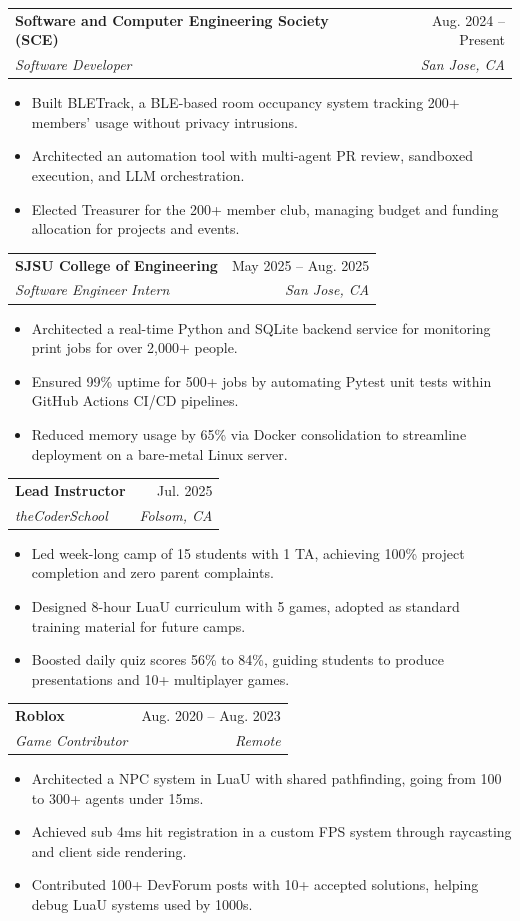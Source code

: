 \documentclass[letterpaper,11pt]{article}
\makeatletter
\newcommand{\resumeItem}[1]{
  \item\small{
    {#1 \vspace{-2pt}}
  }
}
\newcommand{\resumeSubheading}[4]{
  \vspace{-2pt}\item
    \begin{tabular*}{0.97\textwidth}[t]{l@{\extracolsep{\fill}}r}
      \textbf{#1} & #2 \\
      \textit{\small#3} & \textit{\small #4} \\
    \end{tabular*}\vspace{-7pt}
}
\newcommand{\resumeItemListStart}{\begin{itemize}}
\newcommand{\resumeItemListEnd}{\end{itemize}\vspace{-5pt}}
\makeatother
\begin{document}
\resumeSubheading
{Software and Computer Engineering Society (SCE)}{Aug. 2024 -- Present}
{Software Developer}{San Jose, CA}
\resumeItemListStart
\resumeItem{Built BLETrack, a BLE-based room occupancy system tracking 200+ members' usage without privacy intrusions.}
\resumeItem{Architected an automation tool with multi-agent PR review, sandboxed execution, and LLM orchestration.}
\resumeItem{Elected Treasurer for the 200+ member club, managing budget and funding allocation for projects and events.}
\resumeItemListEnd



\resumeSubheading
{SJSU College of Engineering}{May 2025 -- Aug. 2025}
{Software Engineer Intern}{San Jose, CA}
\resumeItemListStart
\resumeItem{Architected a real-time Python and SQLite backend service for monitoring print jobs for over 2,000+ people.}
\resumeItem{Ensured 99\% uptime for 500+ jobs by automating Pytest unit tests within GitHub Actions CI/CD pipelines.}
\resumeItem{Reduced memory usage by 65\% via Docker consolidation to streamline deployment on a bare-metal Linux server.}
\resumeItemListEnd

\resumeSubheading
{Lead Instructor}{Jul. 2025}
{theCoderSchool}{Folsom, CA}
\resumeItemListStart
\resumeItem{Led week-long camp of 15 students with 1 TA, achieving 100\% project completion and zero parent complaints.}
\resumeItem{Designed 8-hour LuaU curriculum with 5 games, adopted as standard training material for future camps.}
\resumeItem{Boosted daily quiz scores 56\% to 84\%, guiding students to produce presentations and 10+ multiplayer games.}
\resumeItemListEnd

\resumeSubheading
{Roblox}{Aug. 2020 -- Aug. 2023}
{Game Contributor}{Remote}
\resumeItemListStart
\resumeItem{Architected a NPC system in LuaU with shared pathfinding, going from 100 to 300+ agents under 15ms.}
\resumeItem{Achieved sub 4ms hit registration in a custom FPS system through raycasting and client side rendering.}
\resumeItem{Contributed 100+ DevForum posts with 10+ accepted solutions, helping debug LuaU systems used by 1000s.}
\resumeItemListEnd
\end{document}
